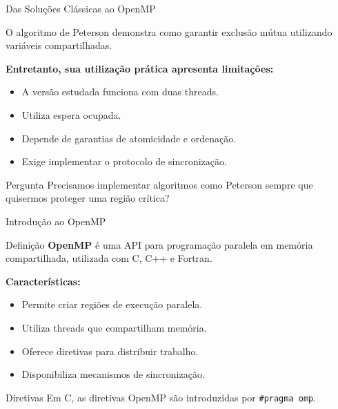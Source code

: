 \documentclass[aspectratio=169,11pt]{beamer}
\begin{document}
\begin{frame}{Das Soluções Clássicas ao OpenMP}

O algoritmo de Peterson demonstra como garantir
exclusão mútua utilizando variáveis compartilhadas.

\vspace{0.3cm}

\textbf{Entretanto, sua utilização prática apresenta limitações:}

\begin{itemize}
    \setlength{\itemsep}{0.2cm}
    \item A versão estudada funciona com duas threads.
    \item Utiliza espera ocupada.
    \item Depende de garantias de atomicidade e ordenação.
    \item Exige implementar o protocolo de sincronização.
\end{itemize}

\vspace{0.3cm}

\begin{alertblock}{Pergunta}
Precisamos implementar algoritmos como Peterson
sempre que quisermos proteger uma região crítica?
\end{alertblock}


\end{frame}



\begin{frame}{Introdução ao OpenMP}

\begin{block}{Definição}
\textbf{OpenMP} é uma API para programação paralela
em memória compartilhada, utilizada com C, C++
e Fortran.
\end{block}

\vspace{0.3cm}

\textbf{Características:}

\begin{itemize}
    \setlength{\itemsep}{0.2cm}
    \item Permite criar regiões de execução paralela.
    \item Utiliza threads que compartilham memória.
    \item Oferece diretivas para distribuir trabalho.
    \item Disponibiliza mecanismos de sincronização.
\end{itemize}

\vspace{0.3cm}

\begin{block}{Diretivas}
Em C, as diretivas OpenMP são introduzidas por
\texttt{\#pragma omp}.
\end{block}

\end{frame}
\end{document}
